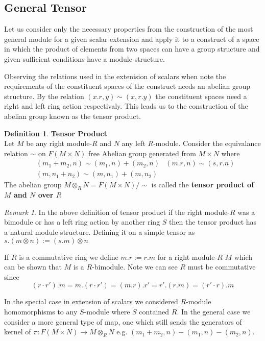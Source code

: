 \documentclass{article}
\theoremstyle{plain}
\theoremstyle{definition}
\newtheorem{defn}{Definition}[section]
\theoremstyle{remark}
\newtheorem{remark}{Remark}[section]
\begin{document}
  \subsection{General Tensor}
  Let us consider only the necessary properties from the construction
  of the most general module for a given scalar extension
  and apply it to a construct
  of a space in which the product of elements from two spaces can have
  a group structure and given sufficient conditions have a module structure.

  Observing the relations used in the extenision of scalars when note the 
  requirements of the constituent spaces of the construct needs an abelian
  group structure. By the relation $(x.r,y)\sim(x,r.y)$ the constituent
  spaces need a right and left ring action respectivaly. This leads us
  to the construction of the abelian group known as the tensor product.
  \begin{defn}\textbf{Tensor Product}\\
    Let $M$ be any right module-$R$ and $N$ any left $R$-module. Consider the
    equivalance relation $\sim$ on $F(M\times N)$ free Abelian group generated from
    $M\times N$ where
  \begin{align*}
    &(m_1+m_2,n)\sim(m_1,n) + (m_2,n)
    &(m.r,n)\sim(s,r.n) \\
    &(m,n_1+n_2)\sim(m,n_1)+(m,n_2)
  \end{align*}
  The abelian group $M\otimes_RN=F(M\times N)/\sim$ is called the \textbf{tensor product of $M$ and $N$ over $R$}
  \end{defn}
  \begin{remark}
    In the above definition of tensor product if the right module-$R$ was a
    bimodule or has a left ring action by another ring $S$ then the tensor
    product has a natural module structure. Defining it on a simple tensor
    as $s.(m\otimes n):= (s.m)\otimes n$

    If $R$ is a commutative ring we define $m.r:=r.m$ for a right module-$R$
    $M$ which can be shown that $M$ is a $R$-bimodule.
    Note we can see $R$ must be commutative since
    \[(r\cdot r').m=m.(r\cdot r')=(m.r).r'=r'.(r.m)=(r'\cdot r).m\]
  \end{remark}
  In the special case in extension of scalars we considered $R$-module 
  homomorphisms to any $S$-module where $S$ contained $R$. In the general
  case we consider a more general type of map, one which still sends the
  generators of kernel of $\pi:F(M\times N)\to M\otimes_RN$ e.g. $(m_1+m_2,n)-(m_1,n)-(m_2,n)$.
\end{document}
